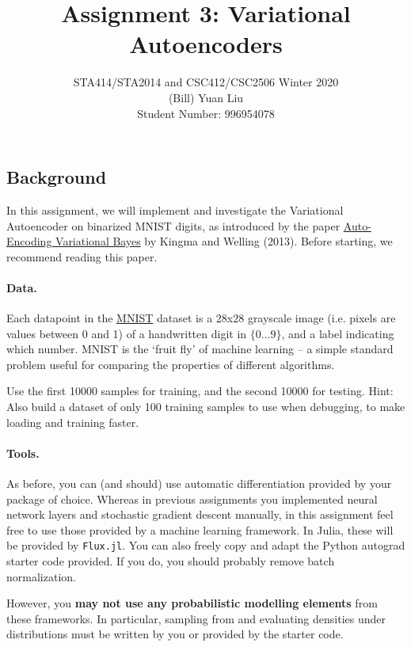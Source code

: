 \documentclass{article}
\begin{document}
\title{Assignment 3: Variational Autoencoders}
\author{STA414/STA2014 and CSC412/CSC2506 Winter 2020\\
  (Bill) Yuan Liu\\
  Student Number: 996954078
}
\maketitle

\subsection{Background}
In this assignment, we will implement and investigate the Variational Autoencoder on binarized MNIST digits, as introduced by the paper \href{https://arxiv.org/pdf/1312.6114.pdf}{Auto-Encoding Variational Bayes} by Kingma and Welling (2013). Before starting, we recommend reading this paper.

\paragraph{Data.}
Each datapoint in the \href{http://yann.lecun.com/exdb/mnist/}{MNIST} dataset is a 28x28 grayscale image (i.e. pixels are values between 0 and 1) of a handwritten digit in $\{0 \dots 9\}$, and a label indicating which number.
MNIST is the `fruit fly' of machine learning -- a simple standard problem useful for comparing the properties of different algorithms.

Use the first 10000 samples for training, and the second 10000 for testing.
Hint: Also build a dataset of only 100 training samples to use when debugging, to make loading and training faster.

\paragraph{Tools.}
As before, you can (and should) use automatic differentiation provided by your package of choice.
Whereas in previous assignments you implemented neural network layers and stochastic gradient descent manually, in this assignment feel free to use those provided by a machine learning framework.
In Julia, these will be provided by \texttt{Flux.jl}.
You can also freely copy and adapt the Python autograd starter code provided.  
If you do, you should probably remove batch normalization.

However, you \textbf{may not use any probabilistic modelling elements} from these frameworks.
In particular, sampling from and evaluating densities under distributions must be written by you or provided by the starter code.
\end{document}
